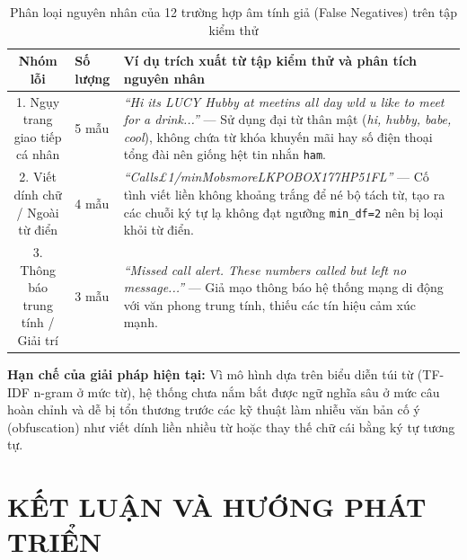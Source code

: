 \documentclass[12pt,a4paper]{report}
\begin{document}
\begin{table}[H]
    \centering
    \caption{Phân loại nguyên nhân của 12 trường hợp âm tính giả (False Negatives) trên tập kiểm thử}
    \label{tab:error_analysis}
    \begin{tabular}{clp{6.5cm}}
        \toprule
        \textbf{Nhóm lỗi} & \textbf{Số lượng} & \textbf{Ví dụ trích xuất từ tập kiểm thử và phân tích nguyên nhân} \\
        \midrule
        1. Ngụy trang giao tiếp cá nhân & 5 mẫu & \textit{``Hi its LUCY Hubby at meetins all day wld u like to meet for a drink...''} --- Sử dụng đại từ thân mật (\textit{hi, hubby, babe, cool}), không chứa từ khóa khuyến mãi hay số điện thoại tổng đài nên giống hệt tin nhắn \texttt{ham}. \\
        2. Viết dính chữ / Ngoài từ điển & 4 mẫu & \textit{``Calls\pounds 1/minMobsmoreLKPOBOX177HP51FL''} --- Cố tình viết liền không khoảng trắng để né bộ tách từ, tạo ra các chuỗi ký tự lạ không đạt ngưỡng \texttt{min\_df=2} nên bị loại khỏi từ điển. \\
        3. Thông báo trung tính / Giải trí & 3 mẫu & \textit{``Missed call alert. These numbers called but left no message...''} --- Giả mạo thông báo hệ thống mạng di động với văn phong trung tính, thiếu các tín hiệu cảm xúc mạnh. \\
        \bottomrule
    \end{tabular}
\end{table}

\textbf{Hạn chế của giải pháp hiện tại:} Vì mô hình dựa trên biểu diễn túi từ (TF-IDF n-gram ở mức từ), hệ thống chưa nắm bắt được ngữ nghĩa sâu ở mức câu hoàn chỉnh và dễ bị tổn thương trước các kỹ thuật làm nhiễu văn bản cố ý (obfuscation) như viết dính liền nhiều từ hoặc thay thế chữ cái bằng ký tự tương tự.

\chapter*{KẾT LUẬN VÀ HƯỚNG PHÁT TRIỂN}
\end{document}
